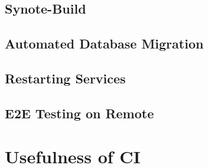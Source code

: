 \subsection{Synote-Build}
\label{subsec:synote-build}

\subsection{Automated Database Migration}
\label{subsec:automated-database-migration}

\subsection{Restarting Services}
\label{subsec:restarting-services}

\subsection{E2E Testing on Remote}
\label{subsec:e2e-testing-on-remote}

\section{Usefulness of CI}
\label{sec:usefulness-of-ci}
